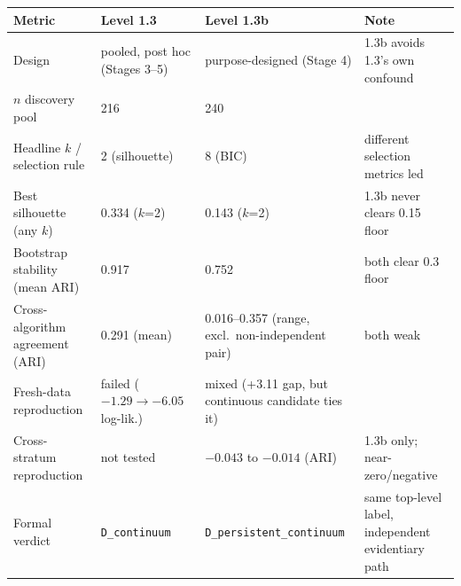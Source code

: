 \begin{tabular}{@{}llll@{}}
\toprule
\textbf{Metric} & \textbf{Level 1.3} & \textbf{Level 1.3b} & \textbf{Note} \\
\midrule
Design & pooled, post hoc (Stages 3--5) & purpose-designed (Stage 4) & 1.3b avoids 1.3's own confound \\
$n$ discovery pool & 216 & 240 & \\
Headline $k$ / selection rule & 2 (silhouette) & 8 (BIC) & different selection metrics led \\
Best silhouette (any $k$) & 0.334 ($k$=2) & 0.143 ($k$=2) & 1.3b never clears 0.15 floor \\
Bootstrap stability (mean ARI) & 0.917 & 0.752 & both clear 0.3 floor \\
Cross-algorithm agreement (ARI) & 0.291 (mean) & 0.016--0.357 (range, excl.\ non-independent pair) & both weak \\
Fresh-data reproduction & failed ($-1.29\to-6.05$ log-lik.) & mixed (+3.11 gap, but continuous candidate ties it) & \\
Cross-stratum reproduction & not tested & $-0.043$ to $-0.014$ (ARI) & 1.3b only; near-zero/negative \\
Formal verdict & \texttt{D\_continuum} & \texttt{D\_persistent\_continuum} & same top-level label, independent evidentiary path \\
\bottomrule
\end{tabular}

